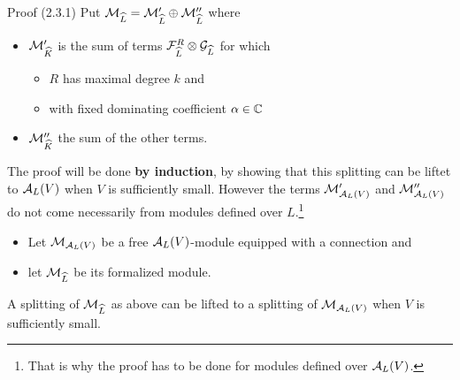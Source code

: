 \begin{frame}[t]{Proof (2.3.1)}
  Put $\mathcal{M}_{\widehat L}=\mathcal{M}_{\widehat L}'\oplus\mathcal{M}_{\widehat L}''$ where
  \begin{itemize}
    \item $\mathcal{M}_{\widehat K}'$ is the sum of terms
      $\mathcal{F}_{\widehat L}^R\otimes\mathcal{G}_{\widehat L}$ for which
      \begin{itemize}
        \item $R$ has maximal degree $k$ and
        \item with fixed dominating coefficient $\alpha\in\mathbb{C}$
      \end{itemize}
    \item $\mathcal{M}_{\widehat K}''$ the sum of the other terms.
  \end{itemize}
  The proof will be done \textbf{by induction}, by showing that this splitting
  can be liftet to $\mathcal{A}_{L}(V)$ when $V$ is sufficiently small.  However the
  terms $\mathcal{M}_{\mathcal{A}_{L}(V)}'$ and $\mathcal{M}_{\mathcal{A}_{L}(V)}''$ do not come necessarily
  from modules defined over $L$.\footnote{That is why the proof has to be done
  for modules defined over $\mathcal{A}_{L}(V)$.}
  \begin{lem}[2.4.1]
    \begin{itemize}
      \item Let $\mathcal{M}_{\mathcal{A}_L(V)}$ be a free $\mathcal{A}_L(V)$-module equipped with a
        connection and
      \item let $\mathcal{M}_{\widehat L}$ be its formalized module.
    \end{itemize}
    A splitting of $\mathcal{M}_{\widehat L}$ as above can be lifted to a splitting of
    $\mathcal{M}_{\mathcal{A}_L(V)}$ when $V$ is sufficiently small.
  \end{lem}
\end{frame}


